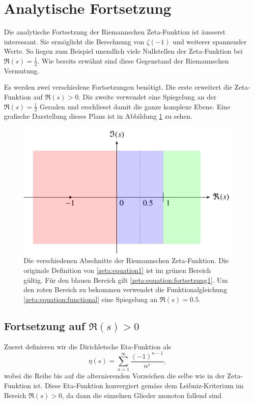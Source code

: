 \section{Analytische Fortsetzung
\label{zeta:section:analytische_fortsetzung}}
%
Die analytische Fortsetzung der Riemannschen Zeta-Funktion ist äusserst interessant.
Sie ermöglicht die Berechnung von $\zeta(-1)$ und weiterer spannender Werte.
So liegen zum Beispiel unendlich viele Nullstellen der Zeta-Funktion bei $\Re(s) = \frac{1}{2}$.
Wie bereits erwähnt sind diese Gegenstand der Riemannschen Vermutung.

Es werden zwei verschiedene Fortsetzungen benötigt.
Die erste erweitert die Zeta-Funktion auf $\Re(s) > 0$.
Die zweite verwendet eine Spiegelung an der $\Re(s) = \frac{1}{2}$ Geraden und erschliesst damit die ganze komplexe Ebene.
Eine grafische Darstellung dieses Plans ist in Abbildung \ref{zeta:fig:continuation_overview} zu sehen.
\begin{figure}
    \centering
\includegraphics{papers/zeta/images/continuation.pdf}
    \caption{
        Die verschiedenen Abschnitte der Riemannschen Zeta-Funktion.
        Die originale Definition von \eqref{zeta:equation1} ist im grünen Bereich gültig.
        Für den blauen Bereich gilt \eqref{zeta:equation:fortsetzung1}.
        Um den roten Bereich zu bekommen verwendet die Funktionalgleichung \eqref{zeta:equation:functional} eine Spiegelung an $\Re(s) = 0.5$.
    }
    \label{zeta:fig:continuation_overview}
\end{figure}

\subsection{Fortsetzung auf $\Re(s) > 0$} \label{zeta:subsection:auf_bereich_ge_0}
Zuerst definieren wir die Dirichletsche Eta-Funktion als
%
\begin{equation}\label{zeta:equation:eta}
    \eta(s)
    =
    \sum_{n=1}^{\infty}
    \frac{(-1)^{n-1}}{n^s},
\end{equation}
wobei die Reihe bis auf die alternierenden Vorzeichen die selbe wie in der Zeta-Funktion ist.
Diese Eta-Funktion konvergiert gemäss dem Leibniz-Kriterium im Bereich $\Re(s) > 0$, da dann die einzelnen Glieder monoton fallend sind.
%

